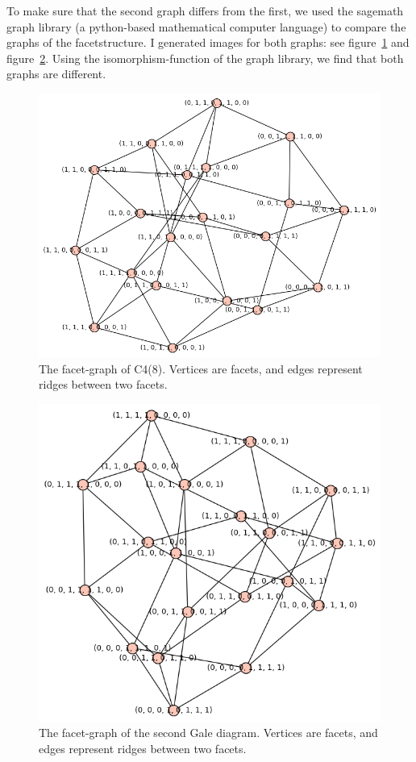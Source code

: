 \documentclass[paper=a4, fontsize=11pt]{scrartcl} %
\theoremstyle{plain}
\begin{document}
To make sure that the second graph differs from the first, we used the sagemath graph library (a python-based mathematical computer language) to compare the graphs of the facetstructure. I generated images for both graphs: see figure~\ref{fig:1} and figure~\ref{fig:2}. Using the isomorphism-function of the graph library, we find that both graphs are different.

\begin{figure}[htbp] %
   \centering
   \includegraphics[width=\textwidth]{C4(8)} 
   \caption{The facet-graph of C4(8). Vertices are facets, and edges represent ridges between two facets.}
   \label{fig:1}
\end{figure}

\begin{figure}[htbp] %
   \centering
   \includegraphics[width=\textwidth]{secondGale} 
   \caption{The facet-graph of the second Gale diagram. Vertices are facets, and edges represent ridges between two facets.}
   \label{fig:2}
\end{figure}
\end{document}

